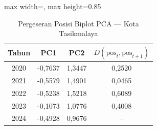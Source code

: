 \begin{table}[H]
\centering
\caption{Pergeseran Posisi Biplot PCA --- Kota Tasikmalaya} \label{tab:appjarak_pca_skor_kota_tasikmalaya}
\begin{adjustbox}{max width=\textwidth, max height=0.85\textheight}
\begin{tabular}{|c|c|c|c|}
\hline
\textbf{Tahun} & \textbf{PC1} & \textbf{PC2} & \textbf{$D(\text{pos}_t, \text{pos}_{t+1})$} \\
\hline
2020 & -0,7637 & 1,3447 & 0,2520 \\
2021 & -0,5579 & 1,4901 & 0,0465 \\
2022 & -0,5238 & 1,5218 & 0,6089 \\
2023 & -0,1073 & 1,0776 & 0,4008 \\
2024 & -0,4928 & 0,9676 & -- \\
\hline
\end{tabular}
\end{adjustbox}
\end{table}